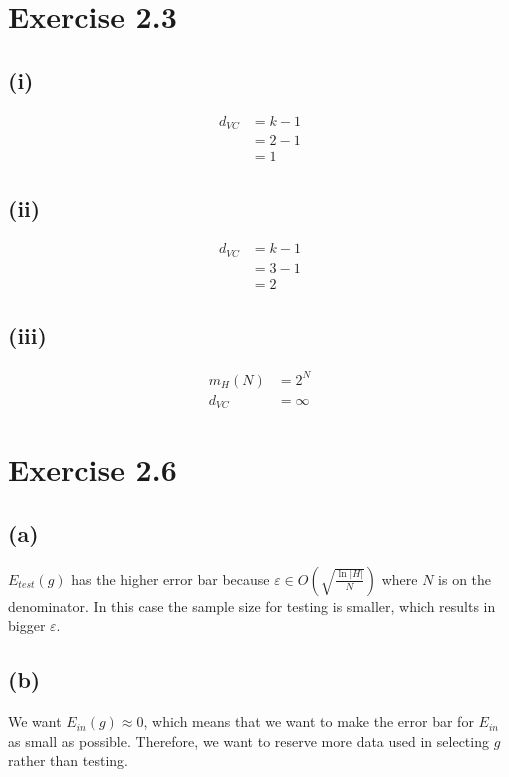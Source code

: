 \documentclass{article}
\begin{document}
	\section*{Exercise 2.3}
	\subsection{(i)}
		\begin{align*}
			d_{VC} &= k - 1\\
			&= 2 - 1\\
			&= \boxed{1}
		\end{align*}
	\subsection{(ii)}
		\begin{align*}
			d_{VC} &= k - 1\\
			&= 3 - 1\\
			&= \boxed{2}
		\end{align*}
	\subsection*{(iii)}
		\begin{align*}
			m_H(N) &= 2^N\\
			d_{VC} &= \boxed{\infty}
		\end{align*}
		
	\section*{Exercise 2.6}
	\subsection*{(a)}
		$E_{test}(g)$ has the higher error bar because $\varepsilon \in O(\sqrt{\frac{\ln |H|}N})$ where $N$ is on the denominator. In this case the sample size for testing is smaller, which results in bigger $\varepsilon$.
	\subsection*{(b)}
		We want $E_{in}(g) \approx 0$, which means that we want to make the error bar for $E_{in}$ as small as possible. Therefore, we want to reserve more data used in selecting $g$ rather than testing.
	
\end{document}
